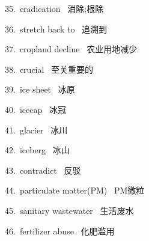 \documentclass[a4paper, 12pt]{article}
\begin{document}
\begin{multicols}{2}
\begin{flushleft}
35.\ eradication \ 消除;根除
\end{flushleft}

\begin{flushleft}
36.\ stretch back to \ 追溯到
\end{flushleft}
\end{multicols}

\begin{multicols}{2}
\begin{flushleft}
37.\ cropland decline \ 农业用地减少
\end{flushleft}

\begin{flushleft}
38.\ crucial \ 至关重要的
\end{flushleft}
\end{multicols}

\begin{multicols}{2}
\begin{flushleft}
39.\ ice sheet \ 冰原
\end{flushleft}

\begin{flushleft}
40.\ icecap \ 冰冠
\end{flushleft}
\end{multicols}

\begin{multicols}{2}
\begin{flushleft}
41.\ glacier \ 冰川
\end{flushleft}

\begin{flushleft}
42.\ iceberg \ 冰山
\end{flushleft}
\end{multicols}

\begin{multicols}{2}
\begin{flushleft}
43.\ contradict \ 反驳
\end{flushleft}

\begin{flushleft}
44.\ particulate matter(PM) \ PM微粒
\end{flushleft}
\end{multicols}

\begin{multicols}{2}
\begin{flushleft}
45.\ sanitary wastewater \ 生活废水
\end{flushleft}

\begin{flushleft}
46.\ fertilizer abuse \ 化肥滥用
\end{flushleft}
\end{multicols}
\end{document}
